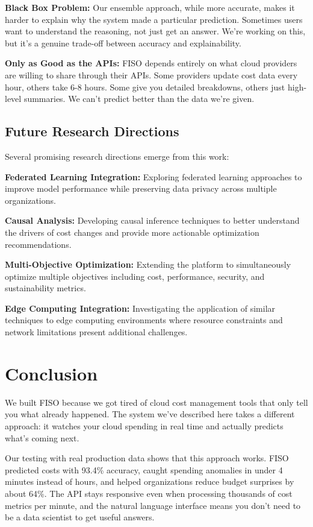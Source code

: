 \documentclass[conference]{IEEEtran}
\begin{document}
\textbf{Black Box Problem:} Our ensemble approach, while more accurate, makes it harder to explain why the system made a particular prediction. Sometimes users want to understand the reasoning, not just get an answer. We're working on this, but it's a genuine trade-off between accuracy and explainability.

\textbf{Only as Good as the APIs:} FISO depends entirely on what cloud providers are willing to share through their APIs. Some providers update cost data every hour, others take 6-8 hours. Some give you detailed breakdowns, others just high-level summaries. We can't predict better than the data we're given.

\subsection{Future Research Directions}

Several promising research directions emerge from this work:

\textbf{Federated Learning Integration:} Exploring federated learning approaches to improve model performance while preserving data privacy across multiple organizations.

\textbf{Causal Analysis:} Developing causal inference techniques to better understand the drivers of cost changes and provide more actionable optimization recommendations.

\textbf{Multi-Objective Optimization:} Extending the platform to simultaneously optimize multiple objectives including cost, performance, security, and sustainability metrics.

\textbf{Edge Computing Integration:} Investigating the application of similar techniques to edge computing environments where resource constraints and network limitations present additional challenges.

\section{Conclusion}

We built FISO because we got tired of cloud cost management tools that only tell you what already happened. The system we've described here takes a different approach: it watches your cloud spending in real time and actually predicts what's coming next.

Our testing with real production data shows that this approach works. FISO predicted costs with 93.4\% accuracy, caught spending anomalies in under 4 minutes instead of hours, and helped organizations reduce budget surprises by about 64\%. The API stays responsive even when processing thousands of cost metrics per minute, and the natural language interface means you don't need to be a data scientist to get useful answers.
\end{document}
